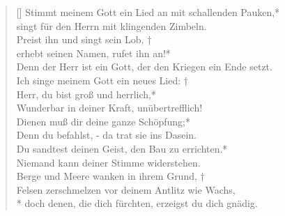\begin{verse}[\versewidth]
 Stimmt meinem Gott ein Lied an mit schallenden Pauken,*\\
singt für den Herrn mit klingenden Zimbeln.\\
\vin Preist ihn und singt sein Lob, †\\
\vin erhebt seinen Namen, rufet ihn an!*\\
\vin Denn der Herr ist ein Gott, der den Kriegen ein Ende setzt.\\
Ich singe meinem Gott ein neues Lied: †\\
Herr, du bist groß und herrlich,*\\
Wunderbar in deiner Kraft, unübertrefflich!\\
\vin Dienen muß dir deine ganze Schöpfung;*\\
\vin Denn du befahlst,  - da trat sie ins Dasein.\\
Du sandtest deinen Geist, den Bau zu errichten.*\\
Niemand kann deiner Stimme widerstehen.\\
\vin Berge und Meere wanken in ihrem Grund, †\\
\vin Felsen zerschmelzen vor deinem Antlitz wie Wachs,\\*
\vin doch denen, die dich fürchten, erzeigst du dich gnädig.\\
\end{verse}


\vspace{0.6cm}


